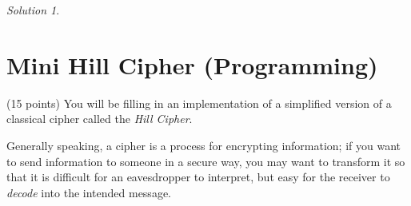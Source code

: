 \documentclass{article}
\theoremstyle{remark}
\newtheorem*{solution}{Solution}
\begin{document}
\medskip

\begin{solution}
\end{solution}

\pagebreak
\section{Mini Hill Cipher (Programming)}

(15 points)
You will be filling in an implementation of a simplified version of a classical cipher called the \textit{Hill Cipher}.

Generally speaking, a cipher is a process for encrypting information; if you want to send information to someone in a secure way, you may want to transform it so that it is difficult for an eavesdropper to interpret, but easy for the receiver to \textit{decode} into the intended message.
\end{document}
